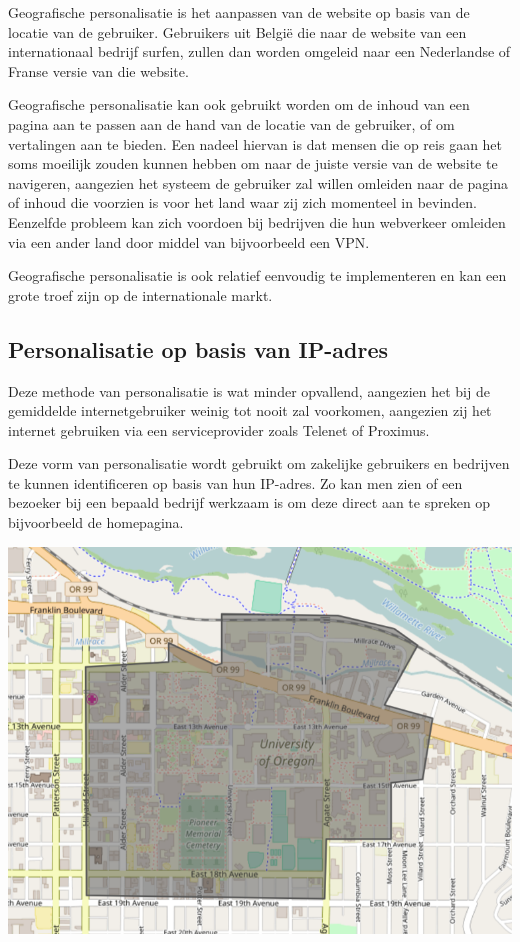 Geografische personalisatie is het aanpassen van de website op basis van de locatie van de gebruiker. Gebruikers uit België die naar de website van een internationaal bedrijf surfen, zullen dan worden omgeleid naar een Nederlandse of Franse versie van die website.

Geografische personalisatie kan ook gebruikt worden om de inhoud van een pagina aan te passen aan de hand van de locatie van de gebruiker, of om vertalingen aan te bieden.
Een nadeel hiervan is dat mensen die op reis gaan het soms moeilijk zouden kunnen hebben om naar de juiste versie van de website te navigeren, aangezien het systeem de gebruiker zal willen omleiden naar de pagina of inhoud die voorzien is voor het land waar zij zich momenteel in bevinden. Eenzelfde probleem kan zich voordoen bij bedrijven die hun webverkeer omleiden via een ander land door middel van bijvoorbeeld een VPN. 

Geografische personalisatie is ook relatief eenvoudig te implementeren en kan een grote troef zijn op de internationale markt. 

\subsection{Personalisatie op basis van IP-adres}
\label{subsec:Personalisatie op basis van IP-adres}

Deze methode van personalisatie is wat minder opvallend, aangezien het bij de gemiddelde internetgebruiker weinig tot nooit zal voorkomen, aangezien zij het internet gebruiken via een serviceprovider zoals Telenet of Proximus. 

Deze vorm van personalisatie wordt gebruikt om zakelijke gebruikers en bedrijven te kunnen identificeren op basis van hun IP-adres. Zo kan men zien of een bezoeker bij een bepaald bedrijf werkzaam is om deze direct aan te spreken op bijvoorbeeld de homepagina.

	\includegraphics[width=\linewidth]{img/e2fcfe784532c41a644e4465f535530d}

